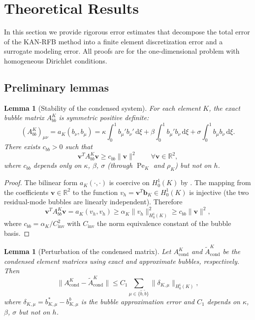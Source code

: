 \documentclass[11pt]{article}
\newcommand{\R}{\mathbb{R}}
\newcommand{\Pe}{\operatorname{Pe}}
\newcommand{\dd}{\,\mathrm{d}}
\newtheorem{lemma}[theorem]{Lemma}
\theoremstyle{remark}
\begin{document}
\section{Theoretical Results}
\label{sec:theory}

In this section we provide rigorous error estimates that decompose the total error of the KAN-RFB method into a finite element discretization error and a surrogate modeling error. All proofs are for the one-dimensional problem with homogeneous Dirichlet conditions.

\subsection{Preliminary lemmas}

\begin{lemma}[Stability of the condensed system]
\label{lem:stability}
For each element $K$, the exact bubble matrix $A_{bb}^K$ is symmetric positive definite:
\begin{equation}
(A_{bb}^K)_{\mu\nu} = a_K(b_\nu, b_\mu) = \kappa\int_0^1 b_\mu' b_\nu'\dd\xi + \beta\int_0^1 b_\mu' b_\nu\dd\xi + \sigma\int_0^1 b_\mu b_\nu\dd\xi.
\end{equation}
There exists $c_{bb} > 0$ such that
\begin{equation}\label{eq:Abb_bound}
\mathbf{v}^T A_{bb}^K \mathbf{v} \geq c_{bb}\|\mathbf{v}\|^2 \qquad \forall \mathbf{v} \in \R^2,
\end{equation}
where $c_{bb}$ depends only on $\kappa$, $\beta$, $\sigma$ (through $\Pe_K$ and $\rho_K$) but not on $h$.
\end{lemma}

\begin{proof}
The bilinear form $a_K(\cdot,\cdot)$ is coercive on $H_0^1(K)$ by . The mapping from the coefficients $\mathbf{v} \in \R^2$ to the function $v_h = \mathbf{v}^T \bm{b}_K \in H_0^1(K)$ is injective (the two residual-mode bubbles are linearly independent). Therefore
\begin{equation}
\mathbf{v}^T A_{bb}^K \mathbf{v} = a_K(v_h, v_h) \geq \alpha_K \|v_h\|_{H^1_0(K)}^2 \geq c_{bb}\|\mathbf{v}\|^2,
\end{equation}
where $c_{bb} = \alpha_K / C_{\mathrm{inv}}^2$ with $C_{\mathrm{inv}}$ the norm equivalence constant of the bubble basis.
\end{proof}

\begin{lemma}[Perturbation of the condensed matrix]
\label{lem:perturbation}
Let $A_{\mathrm{cond}}^K$ and $\widetilde{A}_{\mathrm{cond}}^K$ be the condensed element matrices using exact and approximate bubbles, respectively. Then
\begin{equation}\label{eq:perturbation}
\|A_{\mathrm{cond}}^K - \widetilde{A}_{\mathrm{cond}}^K\| \leq C_1\sum_{\mu \in \{\widehat{b}, \widetilde{b}\}} \|\delta_{K,\mu}\|_{H^1_0(K)},
\end{equation}
where $\delta_{K,\mu} = b_{K,\mu}^* - b_{K,\mu}^b$ is the bubble approximation error and $C_1$ depends on $\kappa$, $\beta$, $\sigma$ but not on $h$.
\end{lemma}
\end{document}
